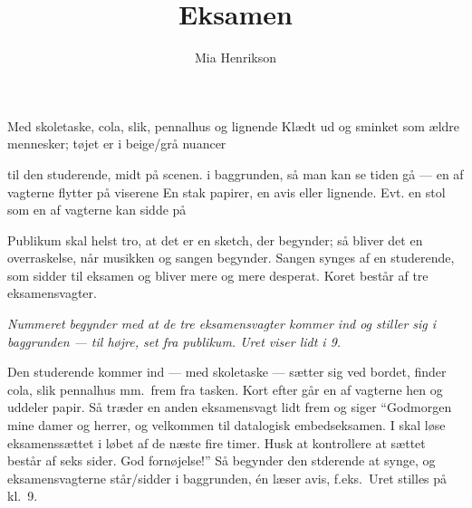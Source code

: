 \documentclass{article}
\title{Eksamen}
\author{Mia Henrikson}
\begin{document}
\maketitle

\begin{roles}
   Med skoletaske, cola, slik, pennalhus og lignende
   Klædt ud og sminket som ældre mennesker;
  tøjet er i beige/grå nuancer
\end{roles}
\begin{props}
   til den studerende, midt på scenen.
   i baggrunden, så man kan se tiden gå --- en af vagterne
  flytter på viserene
   En stak papirer, en avis eller lignende. Evt. en stol som
  en af vagterne kan sidde på 
\end{props}

{ Publikum skal helst tro, at det er en sketch, der begynder; så bliver
  det en overraskelse, når musikken og sangen begynder. Sangen synges af en
  studerende, som sidder til eksamen og bliver mere og mere desperat. Koret
  består af tre eksamensvagter.}

{\em Nummeret begynder med at de tre eksamensvagter kommer ind og
  stiller sig i baggrunden --- til højre, set fra publikum. Uret viser lidt
  i 9.

  Den studerende kommer ind --- med skoletaske --- sætter sig ved bordet,
  finder cola, slik pennalhus mm.\ frem fra tasken. Kort efter går en af
  vagterne hen og uddeler papir. Så træder en anden eksamensvagt lidt frem
  og siger ``Godmorgen mine damer og herrer, og velkommen til datalogisk
  embedseksamen. I skal løse eksamenssættet i løbet af de næste fire timer.
  Husk at kontrollere at sættet består af seks sider. God fornøjelse!'' Så
  begynder den stderende at synge, og eksamensvagterne står/sidder i
  baggrunden, én læser avis, f.eks.\ Uret stilles på kl.\ 9.}

\pagebreak[4]
\end{document}
